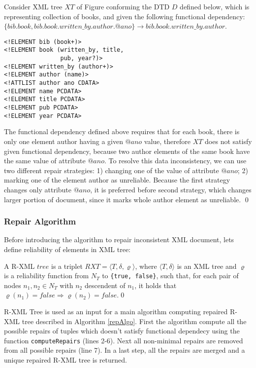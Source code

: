 \begin{example}
Consider XML tree $XT$ of Figure conforming the DTD $D$ defined below, which is representing collection of books, and given the following functional dependency:\\ $\{bib.book, bib.book.written\_by.author.@ano\} \rightarrow bib.book.written\_by.author$.
\begin{verbatim}
<!ELEMENT bib (book+)>
<!ELEMENT book (written_by, title,
                pub, year?)>
<!ELEMENT written_by (author+)>
<!ELEMENT author (name)>
<!ATTLIST author ano CDATA>
<!ELEMENT name PCDATA>
<!ELEMENT title PCDATA>
<!ELEMENT pub PCDATA>
<!ELEMENT year PCDATA>
\end{verbatim}
The functional dependency defined above requires that for each book, there is only one element author having a given $@ano$ value, therefore $XT$ does not satisfy given functional dependency, because two author elements of the same book have the same value of attribute $@ano$. To resolve this data inconsistency, we can use two different repair strategies: 1) changing one of the value of attribute $@ano$; 2) marking one of the element author as unreliable. Because the first strategy changes only attribute $@ano$, it is preferred before second strategy, which changes larger portion of document, since it marks whole author element as unreliable.
\qed
\end{example}


\subsubsection{Repair Algorithm}

Before introducing the algorithm to repair inconsistent XML document, lets define reliability of elements in XML tree:

\begin{define}
A R-XML $tree$ is a triplet $RXT = \langle T, \delta, \varrho \rangle$, where $\langle T, \delta \rangle$ is an XML tree and $\varrho$ is a reliability function from $N_T$ to \texttt{\{true, false\}}, such that, for each pair of nodes $n_1 , n_2 \in N_T$ with $n_2$ descendent of $n_1$, it holds that $\varrho(n_1) = false \Rightarrow \varrho(n_2) = false$.\qed
\end{define}

R-XML Tree is used as an input for a main algorithm computing repaired R-XML tree described in Algorithm \ref{repAlgo}. First the algorithm compute all the possible repairs of tuples which doesn't satisfy functional dependecy using the function \texttt{computeRepairs} (lines 2-6). Next all non-minimal repairs are removed from all possible repairs (line 7). In a last step, all the repairs are merged and a unique repaired R-XML tree is returned.

